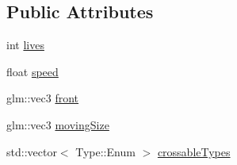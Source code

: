\subsection*{Public Attributes}
\begin{DoxyCompactItemize}
\item 
int \hyperlink{class_a_character_a46261a6f692a2b826ca0f30ccbdf93da}{lives}
\item 
float \hyperlink{class_a_character_a078f65a8d5565962c2f17f44f19eef66}{speed}
\item 
glm\+::vec3 \hyperlink{class_a_character_af8466a49b0a5abcc22a785562aed7257}{front}
\item 
glm\+::vec3 \hyperlink{class_a_character_ab91ce66f359d4c3fb605948689f4fd20}{moving\+Size}
\item 
std\+::vector$<$ Type\+::\+Enum $>$ \hyperlink{class_a_character_a0a3b42d22279b8c13c6e9eab4f74da7b}{crossable\+Types}
\end{DoxyCompactItemize}
